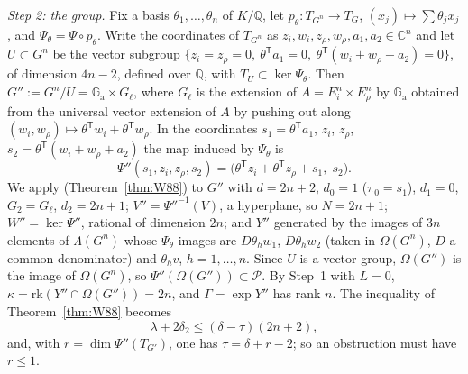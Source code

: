 \documentclass[11pt]{amsart}
\theoremstyle{definition}
\newcommand{\Qb}{\overline{\mathbb{Q}}}
\newcommand{\C}{\mathbb{C}}
\newcommand{\Q}{\mathbb{Q}}
\newcommand{\Ga}{\mathbb{G}_{\mathrm a}}
\begin{document}
\emph{Step 2: the group.} Fix a basis $\theta_1,\dots,\theta_n$ of $K/\Q$, let $p_\theta\colon T_{G^n}\to T_G$,
$(x_j)\mapsto\sum\theta_jx_j$, and $\Psi_\theta=\Psi\circ p_\theta$. Write the coordinates of $T_{G^n}$ as
$z_i,w_i,z_\rho,w_\rho,a_1,a_2\in\C^n$ and let $U\subset G^n$ be the vector subgroup
$\{z_i=z_\rho=0,\ \theta^{\mathsf T}a_1=0,\ \theta^{\mathsf T}(w_i+w_\rho+a_2)=0\}$, of dimension $4n-2$, defined over $\Qb$, with
$T_U\subset\ker\Psi_\theta$. Then $G'':=G^n/U=\Ga\times G_\ell$, where $G_\ell$ is the extension of $A=E_i^n\times E_\rho^n$ by
$\Ga$ obtained from the universal vector extension of $A$ by pushing out along $(w_i,w_\rho)\mapsto\theta^{\mathsf T}w_i+\theta^{\mathsf T}w_\rho$.
In the coordinates $s_1=\theta^{\mathsf T}a_1$, $z_i$, $z_\rho$, $s_2=\theta^{\mathsf T}(w_i+w_\rho+a_2)$ the map induced by
$\Psi_\theta$ is
\[
\Psi''(s_1,z_i,z_\rho,s_2)=\bigl(\theta^{\mathsf T}z_i+\theta^{\mathsf T}z_\rho+s_1,\;s_2\bigr).
\]
We apply \cite[Thm.~4.1]{W88} (Theorem~\ref{thm:W88}) to $G''$ with $d=2n+2$, $d_0=1$ ($\pi_0=s_1$), $d_1=0$,
$G_2=G_\ell$, $d_2=2n+1$; $V''=\Psi''^{-1}(V)$, a hyperplane, so $N=2n+1$; $W''=\ker\Psi''$, rational of dimension
$2n$; and $Y''$ generated by the images of $3n$ elements of $\Lambda(G^n)$ whose $\Psi_\theta$-images are $D\theta_hw_1$,
$D\theta_hw_2$ (taken in $\Omega(G^n)$, $D$ a common denominator) and $\theta_hv$, $h=1,\dots,n$. Since $U$ is a vector
group, $\Omega(G'')$ is the image of $\Omega(G^n)$, so $\Psi''(\Omega(G''))\subset \mathcal P$. By Step~1 with $L=0$,
$\kappa=\mathrm{rk}(Y''\cap\Omega(G''))=2n$, and $\Gamma=\exp Y''$ has rank $n$. The inequality of
Theorem~\ref{thm:W88} becomes
\begin{equation}\label{eq:star}
\lambda+2\delta_2\le(\delta-\tau)(2n+2),
\end{equation}
and, with $r=\dim\Psi''(T_{G'})$, one has $\tau=\delta+r-2$; so an obstruction must have $r\le1$.
\end{document}
